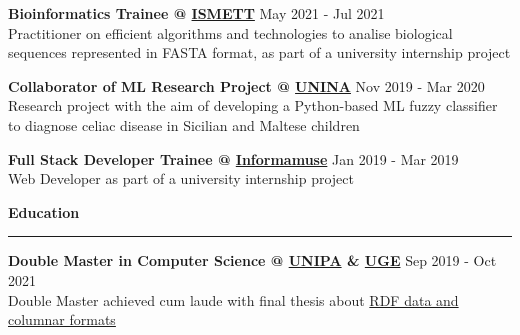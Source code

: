\documentclass[11pt,letterpaper]{article}
\begin{document}
\begin{justify}
\begin{itemize}[label={}, leftmargin=0pt]
\begin{item}
            \end{item}
            \begin{item}
                  \textbf{Bioinformatics Trainee @ \href{https://www.ismett.edu/en/}{ISMETT}}
                  \hfill
                  May 2021 - Jul 2021
                  \vspace{0.05cm}
                  \\
                  Practitioner on efficient algorithms and technologies to analise biological sequences represented in FASTA format, as part of a university internship project
            \end{item}
            \begin{item}
                  \textbf{Collaborator of ML Research Project @ \href{https://www.unina.it/en_GB}{UNINA}}
                  \hfill
                  Nov 2019 - Mar 2020
                  \vspace{0.05cm}
                  \\
                  Research project with the aim of developing a Python-based ML fuzzy classifier to diagnose celiac disease in Sicilian and Maltese children
            \end{item}
            \begin{item}
                  \textbf{Full Stack Developer Trainee @ \href{https://www.informamuse.com/en/home/}{Informamuse}}
                  \hfill
                  Jan 2019 - Mar 2019
                  \vspace{0.05cm}
                  \\
                  Web Developer as part of a university internship project
            \end{item}
      \end{itemize}
      \vspace{0.1cm}
      {\large \textbf{Education} \strut}
      \hrule
      \begin{itemize}[label={}, leftmargin=0pt]
            \begin{item}
                  \textbf{Double Master in Computer Science @ \href{https://www.unipa.it/mobilita/en/}{UNIPA} \& \href{https://www.univ-gustave-eiffel.fr/en/}{UGE}}
                  \hfill
                  Sep 2019 - Oct 2021
                  \vspace{0.05cm}
                  \\
                  Double Master achieved cum laude with final thesis about \href{https://raw.githubusercontent.com/dariocurr/thesis/main/thesis.pdf}{RDF data and columnar formats}

\end{item}
\end{itemize}
\end{justify}
\end{document}
